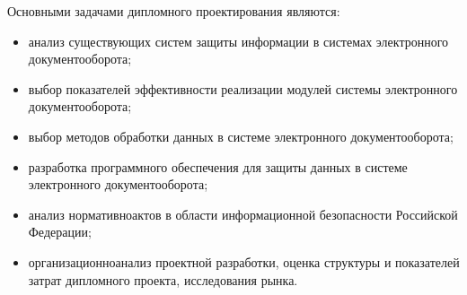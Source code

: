 \vspace{\baselineskip}
Основными задачами дипломного проектирования являются:
\begin{itemize}
	\item анализ существующих систем защиты информации в системах электронного документооборота;
	\item выбор показателей эффективности реализации модулей системы электронного документооборота;
	\item выбор методов обработки данных в системе электронного документооборота;
	\item разработка программного обеспечения для защиты данных в системе электронного документооборота;
	\item анализ нормативно актов в области информационной безопасности Российской Федерации;
	\item организационно анализ проектной разработки, оценка структуры и показателей затрат дипломного проекта, исследования рынка.
\end{itemize}

\clearpage